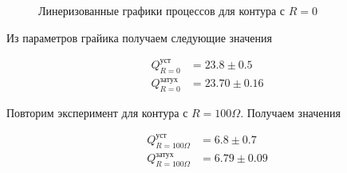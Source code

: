 \documentclass{article}
\begin{document}
\newpage

\begin{figure}[h]
    \caption{Линеризованные графики процессов для контура с $R=0$}\label{fig:R_0_damp}
    \newpage
\end{figure}

Из параметров грайика получаем следующие значения

\begin{equation}
    \begin{aligned}
        Q_{R=0}^{уст} &= 23.8 \pm 0.5 \\
        Q_{R=0}^{затух} &= 23.70 \pm 0.16
    \end{aligned}
\end{equation}

\vspace{1cm}

Повторим эксперимент для контура с $R=100\Omega$. Получаем значения

\begin{equation}
    \begin{aligned}
        Q_{R=100\Omega}^{уст} &= 6.8 \pm 0.7 \\
        Q_{R=100\Omega}^{затух} &= 6.79 \pm 0.09
    \end{aligned}
\end{equation}



\newpage
\end{document}

